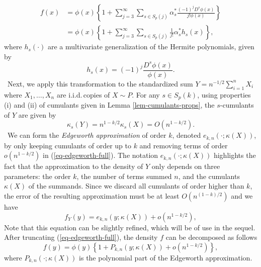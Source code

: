 \begin{align}
    f(x) 
    &= \phi(x) \left\{ 1 + \sum_{j=3}^\infty 
    \sum_{s \in S_p(j)}
    \alpha^*_s \frac{(-1)^j D^s \phi(x)}{j! \phi(x)}\right\} \nonumber \\
    &= \phi(x) \left\{
        1 + \sum_{j=3}^\infty  \sum_{s \in S_p(j)} \frac{1}{j!}\alpha^*_s h_s(x)
    \right\}, \label{eq-edgeworth-full}
\end{align} 
where $h_s(\cdot)$ are a multivariate generalization of the Hermite polynomials, given by
\begin{equation} \label{eq-hermite}
    h_s(x) = (-1)^j \frac{D^s \phi(x)}{\phi(x)}.
\end{equation}
\
Next, we apply this transformation to the standardized sum $Y = n^{-1/2}\sum_{i=1}^n X_i$ where $X_1, \ldots, X_n$ are i.i.d.\,copies of $X \sim P$. For any $s \in S_p(k)$, using properties (i) and (ii) of cumulants given in Lemma \ref{lem-cumulants-props}, the $s$-cumulants of $Y$ are given by 
\begin{equation*}
    \kappa_s(Y) = n^{1-k/2} \kappa_s(X) = O(n^{1-k/2}).
\end{equation*}
\
We can form the \textit{Edgeworth approximation} of order $k$, denoted $e_{k, n}(\cdot; \kappa(X))$, by only keeping cumulants of order up to $k$ and removing terms of order $o(n^{1-k/2})$ in (\ref{eq-edgeworth-full}). The notation $e_{k, n}(\cdot; \kappa(X))$ highlights the fact that the approximation to the density of $Y$ only depends on three parameters: the order $k$, the number of terms summed $n$, and the cumulants $\kappa(X)$ of the summands. Since we discard all cumulants of order higher than $k$, the error of the resulting approximation must be at least $O(n^{(1-k)/2})$ and we have
\begin{equation} \label{eq-edgeworth}
    f_Y(y) = e_{k, n}(y; \kappa(X)) + o(n^{1-k/2}),
\end{equation}
Note that this equation can be slightly refined, which will be of use in the sequel. After truncating (\ref{eq-edgeworth-full}), the density $f$ can be decomposed as follows
\begin{equation} \label{eq-edge-polynomial}
    f(y) = \phi(y)\left\{1 + P_{k, n}(y; \kappa(X)) + o(n^{1-k/2})\right\},
\end{equation}
where $P_{k, n}(\cdot; \kappa(X))$ is the polynomial part of the Edgeworth approximation.

